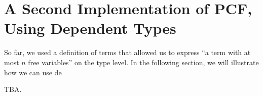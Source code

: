 \section{A Second Implementation of PCF, Using Dependent Types}

So far, we used a definition of terms that allowed us to express ``a term with at most $n$ free variables'' on the type level. In the following section, we will illustrate how we can use de

TBA.